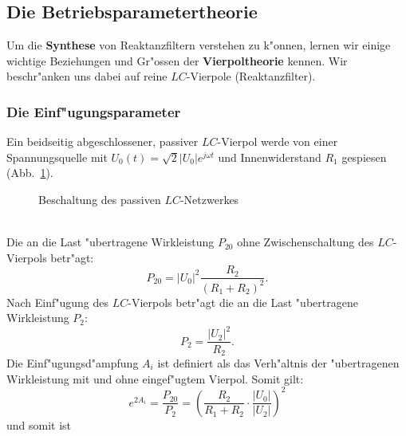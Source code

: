 \subsection{Die Betriebsparametertheorie}
Um die {\bf Synthese} von Reaktanzfiltern verstehen zu k"onnen, lernen wir
einige wichtige Beziehungen und Gr"ossen der {\bf Vierpoltheorie}
kennen. Wir beschr"anken uns dabei auf reine $LC$-Vierpole (Reaktanzfilter).
\subsubsection{Die Einf"ugungsparameter}
Ein beidseitig abgeschlossener, passiver $LC$-Vierpol werde von einer
Spannungsquelle mit $ U_0(t)=\sqrt{2} | U_0 | e^{j \omega t}$ und
Innenwiderstand $R_1$ gespiesen (Abb.~\ref{besch-nw}).
\begin{figure}[!htb]
\vspace*{-3mm}
\begin{center}
  \caption{Beschaltung des passiven $LC$-Netzwerkes \label{besch-nw}}
\end{center}
\vspace*{-6mm}
\end{figure}~~\\
Die an die Last "ubertragene Wirkleistung $P_{20}$ ohne Zwischenschaltung
des $LC$-Vierpols betr"agt:
\begin{equation}
P_{20}={| U_0 |}^2 \frac{R_2}{(R_1 + R_2)^2}.
\end{equation}
Nach Einf"ugung des $LC$-Vierpols betr"agt die an die Last "ubertragene
Wirkleistung $P_2$:
\begin{equation}
P_2=\frac{|U_2|^2}{R_2}.
\end{equation}
\nit Die Einf"ugungsd"ampfung $A_i$ ist definiert als das Verh"altnis 
der "ubertragenen
Wirkleistung mit und ohne eingef"ugtem Vierpol. Somit gilt:
\begin{equation}
e^{2 A_i}=\frac{P_{20}}{P_2}=\left( \frac{R_2}{R_1 + R_2}
                                        \cdot \frac{|U_0|}{|U_2|} \right)^2
\end{equation}
und somit ist\\~~\\
\\~~\\
